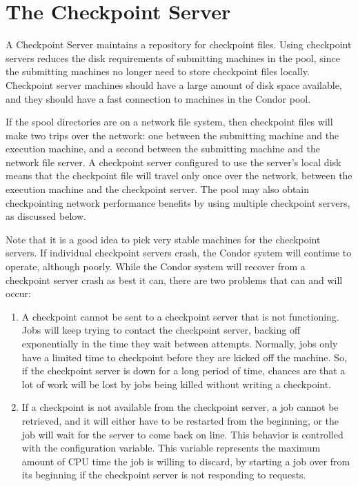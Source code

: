 \section{\label{sec:Ckpt-Server} The Checkpoint Server}

A Checkpoint Server maintains a repository for checkpoint files.
Using checkpoint servers reduces the disk requirements of submitting
machines in the pool, since the submitting machines no longer need to
store checkpoint files locally.
Checkpoint server machines should have a large amount of disk space
available, and they should have a fast connection to machines
in the Condor pool.

If the spool directories are on a network file system, then
checkpoint files will make two trips over the network: one between the
submitting machine and the execution machine, and a second between the
submitting machine and the network file server.
A checkpoint server configured to use the server's local disk
means that the checkpoint file will travel only once over the
network, between the execution machine and the checkpoint server.
The pool may also obtain checkpointing network performance benefits by
using multiple checkpoint servers, as discussed below.

Note that it is a good idea to pick very stable machines for the checkpoint
servers.
If individual checkpoint servers crash, the Condor system will continue to
operate, although poorly.  
While the Condor system will recover from a checkpoint server crash
as best it can, there are two problems that can and will occur:
\begin{enumerate}

\item A checkpoint cannot be sent to a checkpoint server that
is not functioning.
Jobs will keep trying to contact the checkpoint server, backing
off exponentially in the time they wait between attempts.
Normally, jobs only have a limited time to checkpoint before they are
kicked off the machine.
So, if the checkpoint server is down for a long period of time,
chances are that a lot of work will be lost by jobs being killed 
without writing a checkpoint. 

\item If a checkpoint is not available from the checkpoint server,
a job cannot be retrieved, and it will either have to be restarted from
the beginning, or the job will wait for the server to come back on line.
This behavior is controlled with the
 configuration variable.
This variable represents the maximum amount of CPU time the job is
willing to discard, by starting a job over from its beginning if the
checkpoint server is not responding to requests.

\end{enumerate}

